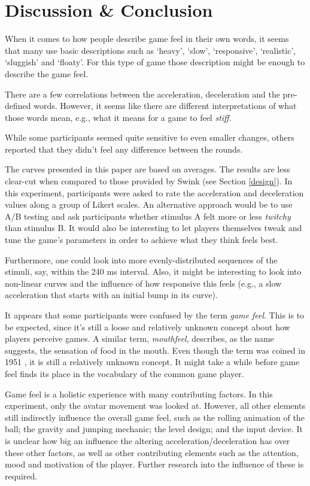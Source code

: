 \section{Discussion \& Conclusion} \label{discussion}
When it comes to how people describe game feel in their own words, it seems that many use basic descriptions such as `heavy', `slow', `responsive', `realistic', `sluggish' and `floaty'. For this type of game those description might be enough to describe the game feel.

There are a few correlations between the acceleration, deceleration and the pre-defined words. However, it seems like there are different interpretations of what those words mean, e.g., what it means for a game to feel \textit{stiff}.

While some participants seemed quite sensitive to even smaller changes, others reported that they didn't feel any difference between the rounds.

The curves presented in this paper are based on averages. The results are less clear-cut when compared to those provided by Swink (see Section \ref{design}). In this experiment, participants were asked to rate the acceleration and deceleration values along a group of Likert scales. An alternative approach would be to use A/B testing and ask participants whether stimulus A felt more or less \textit{twitchy} than stimulus B. It would also be interesting to let players themselves tweak and tune the game's parameters in order to achieve what they think feels best.

Furthermore, one could look into more evenly-distributed sequences of the stimuli, say, within the 240 ms interval. Also, it might be interesting to look into non-linear curves and the influence of how responsive this feels (e.g., a slow acceleration that starts with an initial bump in its curve).

It appears that some participants were confused by the term \textit{game feel}. This is to be expected, since it's still a loose and relatively unknown concept about how players perceive games. A similar term, \textit{mouthfeel}, describes, as the name suggests, the sensation of food in the mouth. Even though the term was coined in 1951 \cite{mouthfeel}, it is still a relatively unknown concept. It might take a while before game feel finds its place in the vocabulary of the common game player.

Game feel is a holistic experience with many contributing factors. In this experiment, only the avatar movement was looked at. However, all other elements still indirectly influence the overall game feel, such as the rolling animation of the ball; the gravity and jumping mechanic; the level design; and the input device. It is unclear how big an influence the altering acceleration/deceleration has over these other factors, as well as other contributing elements such as the attention, mood and motivation of the player. Further research into the influence of these is required.